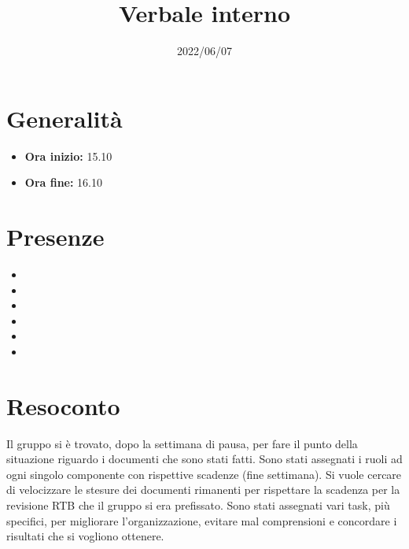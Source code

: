 \documentclass{classes/base}
\title{Verbale interno}
\date{2022/06/07}
\author{\angela}
\renewcommand{\maketitle}{
    
}
\begin{document}
    \maketitle

    \section*{Generalità}
    \begin{itemize}
        \item \textbf{Ora inizio:} 15.10
        \item \textbf{Ora fine:} 16.10
    \end{itemize}

    \section*{Presenze}
    \begin{itemize}
        \item \tommaso
        \item \marcob
        \item \marcov
        \item \angela
        \item \ruth
        \item \matteo
    \end{itemize}

    \section*{Resoconto}
    Il gruppo si è trovato, dopo la settimana di pausa, per fare il punto della situazione riguardo i documenti che sono stati fatti.
    Sono stati assegnati i ruoli ad ogni singolo componente con rispettive scadenze (fine settimana). 
    Si vuole cercare di velocizzare le stesure dei documenti rimanenti per rispettare la scadenza per la revisione RTB che il gruppo si era prefissato.
    Sono stati assegnati vari task, più specifici, per migliorare l'organizzazione, evitare mal comprensioni e concordare i risultati che si vogliono ottenere.
\end{document}
